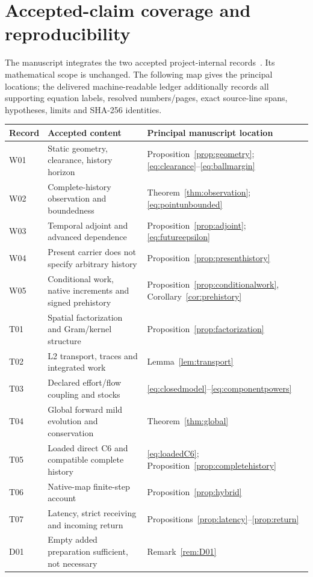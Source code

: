 \section{Accepted-claim coverage and reproducibility}\label{app:coverage}
The manuscript integrates the two accepted project-internal records~\cite{Wreview,Treview}. Its mathematical scope is unchanged. The following map gives the principal locations; the delivered machine-readable ledger additionally records all supporting equation labels, resolved numbers/pages, exact source-line spans, hypotheses, limits and SHA-256 identities.

\begin{longtable}{>{\raggedright\arraybackslash}p{}>{\raggedright\arraybackslash}p{}>{\raggedright\arraybackslash}p{}}
\toprule Record & Accepted content & Principal manuscript location\\\midrule\endhead
W01 & Static geometry, clearance, history horizon & Proposition~\ref{prop:geometry}; \eqref{eq:clearance}--\eqref{eq:ballmargin}\\
W02 & Complete-history observation and boundedness & Theorem~\ref{thm:observation}; \eqref{eq:pointunbounded}\\
W03 & Temporal adjoint and advanced dependence & Proposition~\ref{prop:adjoint}; \eqref{eq:futureepsilon}\\
W04 & Present carrier does not specify arbitrary history & Proposition~\ref{prop:presenthistory}\\
W05 & Conditional work, native increments and signed prehistory & Proposition~\ref{prop:conditionalwork}, Corollary~\ref{cor:prehistory}\\
T01 & Spatial factorization and Gram/kernel structure & Proposition~\ref{prop:factorization}\\
T02 & L2 transport, traces and integrated work & Lemma~\ref{lem:transport}\\
T03 & Declared effort/flow coupling and stocks & \eqref{eq:closedmodel}--\eqref{eq:componentpowers}\\
T04 & Global forward mild evolution and conservation & Theorem~\ref{thm:global}\\
T05 & Loaded direct C6 and compatible complete history & \eqref{eq:loadedC6}; Proposition~\ref{prop:completehistory}\\
T06 & Native-map finite-step account & Proposition~\ref{prop:hybrid}\\
T07 & Latency, strict receiving and incoming return & Propositions~\ref{prop:latency}--\ref{prop:return}\\
D01 & Empty added preparation sufficient, not necessary & Remark~\ref{rem:D01}\\\bottomrule
\end{longtable}

